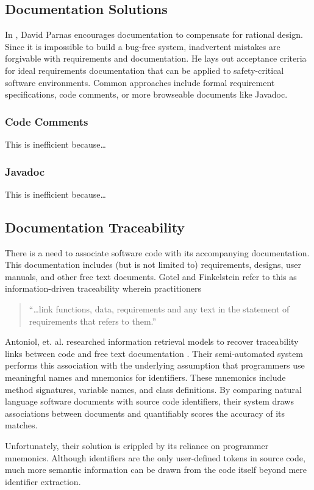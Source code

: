 \subsection{Documentation Solutions}

In \cite{Parnas1986}, David Parnas encourages documentation to compensate for
rational design. Since it is impossible to build a bug-free system, inadvertent
mistakes are forgivable with requirements and documentation. He lays out
acceptance criteria for ideal requirements documentation that can be applied to
safety-critical software environments. Common approaches include formal
requirement specifications, code comments, or more browseable documents like
Javadoc\cite{Javadoc}.

\subsubsection*{Code Comments}
This is inefficient because\ldots

\subsubsection*{Javadoc}
This is inefficient because\ldots

\subsection{Documentation Traceability}
There is a need to associate software code with its accompanying documentation.
This documentation includes (but is not limited to) requirements, designs, user
manuals, and other free text documents. Gotel and Finkelstein refer to this as
information-driven traceability wherein practitioners
\begin{quote}
``\ldots link functions, data, requirements and any text in the statement of
requirements that refers to them.'' \cite{Gotel1994}
\end{quote}

Antoniol, et. al. researched information retrieval models to recover 
traceability links between code and free text documentation \cite{Antoniol2000}.
Their semi-automated system performs this association with the underlying
assumption that programmers use meaningful names and mnemonics for identifiers.
These mnemonics include method signatures, variable names, and class
definitions. By comparing natural language software documents with source code
identifiers, their system draws associations between documents and quantifiably
scores the accuracy of its matches.

Unfortunately, their solution is crippled by its reliance on programmer
mnemonics. Although identifiers are the only user-defined tokens in source
code, much more semantic information can be drawn from the code itself
beyond mere identifier extraction.


